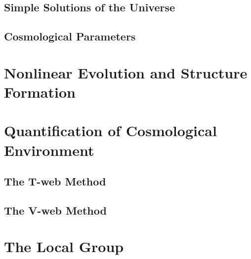 	\subsection{Simple Solutions of the Universe}
	\label{subsec:SimpleSolutionsOfTheUniverse}


	\subsection{Cosmological Parameters}
	\label{subsec:CosmologicalParameters}






\section{Nonlinear Evolution and Structure Formation}
\label{sec:NonlinearEvolutionAndStructureFormation}




\section{Quantification of Cosmological Environment}
\label{sec:QuantificationOfCosmologicalEnvironment}


	\subsection{The T-web Method}
	\label{subsec:TheT-webMethod}


	\subsection{The V-web Method}
	\label{subsec:TheV-webMethod}






\section{The Local Group}
\label{sec:TheLocalGroup}
